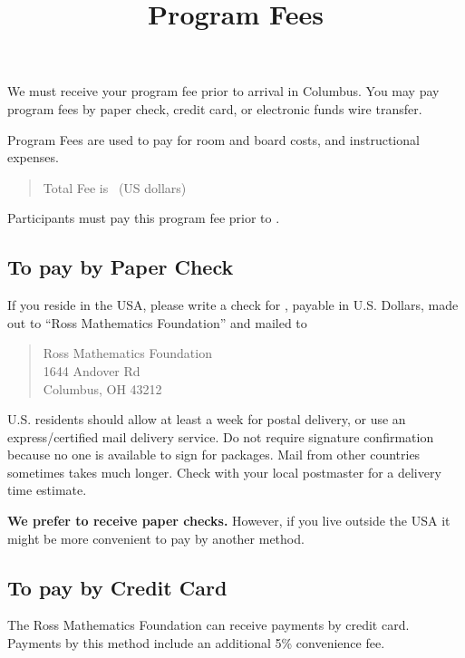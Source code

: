 \documentclass[11pt]{ross}
\title{Program Fees}
\begin{document}
\maketitle

We must receive your program fee prior to arrival in Columbus.  You
may pay program fees by paper check, credit card, or electronic funds
wire transfer.

Program Fees are used to pay for room and board costs, and instructional expenses.
\begin{quote}
Total Fee is \totalfee \ (US dollars)
\end{quote}  

Participants must pay this program fee prior to \feeduedate.

\subsection*{To pay by Paper Check}

If you reside in the USA, please write a check for \totalfee, payable
in U.S. Dollars, made out to ``Ross Mathematics Foundation'' and
mailed to
\begin{quote}
Ross Mathematics Foundation  \\
1644 Andover Rd \\
Columbus, OH 43212
\end{quote}
U.S. residents should allow at least a week for postal delivery, or
use an express/certified mail delivery service. Do not require
signature confirmation because no one is available to sign for
packages.  Mail from other countries sometimes takes much longer.
Check with your local postmaster for a delivery time estimate.

\textbf{We prefer to receive paper checks.} However, if you live
outside the USA it might be more convenient to pay by another method.

\subsection*{To pay by Credit Card}


The Ross Mathematics Foundation can receive payments by credit card.
Payments by this method include an additional 5\% convenience fee.
\end{document}
